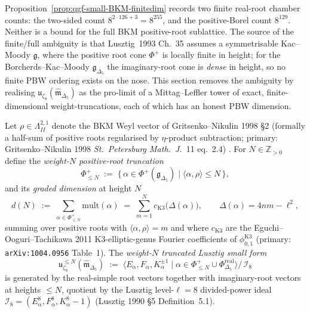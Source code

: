 Proposition~\ref{prop:qgf-small-BKM-finitedim} records two finite
real-root chamber counts: the two-sided count
\(8^{2\cdot 126+3}=8^{255}\), and the positive-Borel count
\(8^{129}\). Neither is a bound for the full BKM positive-root
sublattice. The source of the finite/full ambiguity is that
Lusztig~1993 Ch.~35 assumes a symmetrisable Kac--Moody $\mathfrak g$,
where the positive root cone $\Phi^+$ is locally finite in height; for
the Borcherds--Kac--Moody $\mathfrak g_{\Delta_5}$ the imaginary-root
cone is \emph{dense} in height, so no finite PBW ordering exists on
the nose. This section removes the ambiguity by realising
$\mathfrak u_{\zeta_8}(\widehat{\mathfrak m}_{\Delta_5})$ as the
pro-limit of a Mittag--Leffler tower of exact, finite-dimensional
weight-truncations, each of which has an honest PBW dimension.

\begin{definition}
\label{def:qgf-weight-truncated-small-form}
Let $\rho\in\Lambda^{2,1}_{II}$ denote the BKM Weyl vector of
Gritsenko--Nikulin 1998 \S2 (formally a half-sum of positive roots
regularised by $\eta$-product subtraction; primary: Gritsenko--Nikulin
1998 \emph{St.~Petersburg Math.~J.}~11 eq.~2.4)
\cite{GritsenkoNikulin1998}. For $N\in\mathbb Z_{>0}$
define the \emph{weight-$N$ positive-root truncation}
\[
 \Phi^+_{\leq N}
 \;:=\;
 \{\,\alpha\in\Phi^+(\mathfrak g_{\Delta_5})
 \mid \langle\alpha,\rho\rangle \leq N\,\},
\]
and its \emph{graded dimension} at height $N$
\[
 d(N)
 \;:=\;
 \sum_{\alpha\in\Phi^+_{\leq N}}\mathrm{mult}(\alpha)
 \;=\;
 \sum_{m=1}^{N}
 c_{\mathrm{K3}}\!\bigl(\Delta(\alpha)\bigr),
 \qquad
 \Delta(\alpha)=4nm-\ell^2,
\]
summing over positive roots with $\langle\alpha,\rho\rangle=m$ and
where $c_{\mathrm{K3}}$ are the Eguchi--Ooguri--Tachikawa 2011
K3-elliptic-genus Fourier coefficients of $\phi_{0,1}^{\mathrm K3}$
(primary: \texttt{arXiv:1004.0956} Table~1). The \emph{weight-$N$
truncated Lusztig small form}
\[
 \mathfrak u_{\zeta_8}^{\leq N}(\widehat{\mathfrak m}_{\Delta_5})
 \;:=\;
 \bigl\langle E_\alpha, F_\alpha, K_\alpha^{\pm 1}\mid
 \alpha\in\Phi^+_{\leq N}\cup\Phi^{\mathrm{real}}_{\Delta_5}
 \bigr\rangle\big/\,\mathcal I_8
\]
is generated by the real-simple root vectors together with
imaginary-root vectors at heights $\leq N$, quotient by the
Lusztig level-$\ell=8$ divided-power ideal
$\mathcal I_8=(E_\alpha^8, F_\alpha^8, K_\alpha^8-1)$
(Lusztig 1990 \S5 Definition~5.1).
\end{definition}

